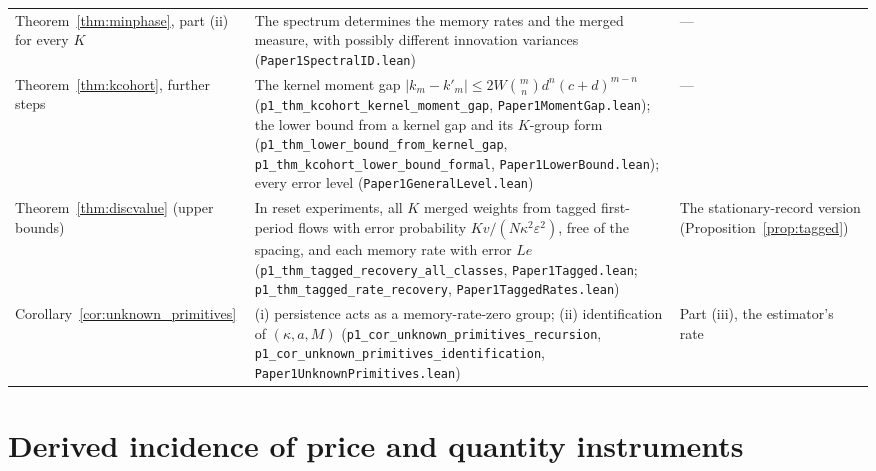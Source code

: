\documentclass[12pt]{article}
\theoremstyle{definition}
\theoremstyle{remark}
\begin{document}
\begin{longtable}{>{\raggedright\arraybackslash}p{}>{\raggedright\arraybackslash}p{}>{\raggedright\arraybackslash}p{}}
Theorem~\ref{thm:minphase}, part (ii) for every $K$ & The spectrum determines the memory rates and the merged measure, with possibly different innovation variances (\nolinkurl{Paper1SpectralID.lean}) & ---\\
Theorem~\ref{thm:kcohort}, further steps & The kernel moment gap $|k_m-k'_m|\le2W\binom mn d^n(c+d)^{m-n}$ (\nolinkurl{p1_thm_kcohort_kernel_moment_gap}, \nolinkurl{Paper1MomentGap.lean}); the lower bound from a kernel gap and its $K$-group form (\nolinkurl{p1_thm_lower_bound_from_kernel_gap}, \nolinkurl{p1_thm_kcohort_lower_bound_formal}, \nolinkurl{Paper1LowerBound.lean}); every error level (\nolinkurl{Paper1GeneralLevel.lean}) & ---\\
Theorem~\ref{thm:discvalue} (upper bounds) & In reset experiments, all $K$ merged weights from tagged first-period flows with error probability $Kv/(N\kappa^2\varepsilon^2)$, free of the spacing, and each memory rate with error $Le$ (\nolinkurl{p1_thm_tagged_recovery_all_classes}, \nolinkurl{Paper1Tagged.lean}; \nolinkurl{p1_thm_tagged_rate_recovery}, \nolinkurl{Paper1TaggedRates.lean}) & The stationary-record version (Proposition~\ref{prop:tagged})\\
Corollary~\ref{cor:unknown_primitives} & (i) persistence acts as a memory-rate-zero group; (ii) identification of $(\kappa,a,M)$ (\nolinkurl{p1_cor_unknown_primitives_recursion}, \nolinkurl{p1_cor_unknown_primitives_identification}, \nolinkurl{Paper1UnknownPrimitives.lean}) & Part (iii), the estimator's rate\\
\bottomrule
\end{longtable}


\section{Derived incidence of price and quantity instruments}\label{app:instruments}
\end{document}
